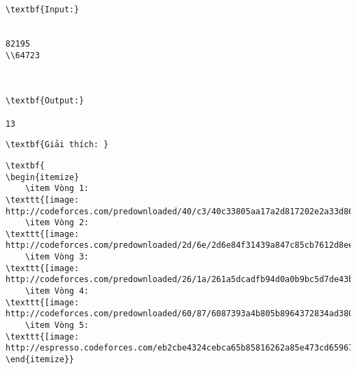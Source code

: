 \begin{verbatim}
\textbf{Input:}


82195
\\64723



\textbf{Output:}

13

\end{verbatim}
\begin{verbatim}
\textbf{Giải thích: }\end{verbatim}
\begin{verbatim}
\textbf{
\begin{itemize}
	\item Vòng 1: 
\texttt{[image: http://codeforces.com/predownloaded/40/c3/40c33805aa17a2d817202e2a33d8662abdbb7cda.png]}
	\item Vòng 2: 
\texttt{[image: http://codeforces.com/predownloaded/2d/6e/2d6e84f31439a847c85cb7612d8ee372e6393288.png]}
	\item Vòng 3: 
\texttt{[image: http://codeforces.com/predownloaded/26/1a/261a5dcadfb94d0a0b9bc5d7de43bb036ccfa32c.png]}
	\item Vòng 4: 
\texttt{[image: http://codeforces.com/predownloaded/60/87/6087393a4b805b8964372834ad38016470872ac2.png]}
	\item Vòng 5: 
\texttt{[image: http://espresso.codeforces.com/eb2cbe4324cebca65b85816262a85e473cd65967.png]}
\end{itemize}}\end{verbatim}